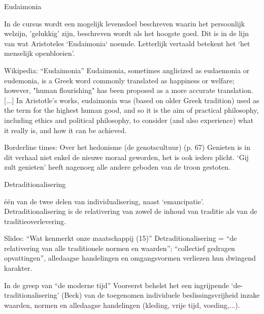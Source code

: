 \documentclass[main.tex]{subfiles}
\begin{document}
\begin{examenvraag}
    \begin{vraag}
        Eudaimonia
    \end{vraag}

    \begin{antwoord}
        In de cursus wordt een mogelijk levensdoel beschreven waarin het persoonlijk welzijn, 'gelukkig' zijn, beschreven wordt als het hoogste goed.
        Dit is in de lijn van wat Aristoteles `Eudaimonia` noemde.
        Letterlijk vertaald betekent het `het menselijk openbloeien'.
        \begin{citaat}{Wikipedia: ``Eudaimonia''}
            Eudaimonia, sometimes anglicized as eudaemonia or eudemonia, is a Greek word commonly translated as happiness or welfare; however, "human flourishing" has been proposed as a more accurate translation.
            [...]
            In Aristotle's works, eudaimonia was (based on older Greek tradition) used as the term for the highest human good, and so it is the aim of practical philosophy, including ethics and political philosophy, to consider (and also experience) what it really is, and how it can be achieved.
        \end{citaat}
        \begin{citaat}{Borderline times: Over het hedonisme (de genotscultuur) (p. 67)}
            Genieten is in dit verhaal niet enkel de nieuwe moraal geworden, het is ook ieders plicht.
            `Gij zult genieten' heeft nagenoeg alle andere geboden van de troon gestoten.
        \end{citaat}
    \end{antwoord}
\end{examenvraag}


\begin{examenvraag}
    \begin{vraag}
        Detraditionalisering
    \end{vraag}

    \begin{antwoord}
        \'e\'en van de twee delen van individualisering, naast `emancipatie'.
        Detraditionalisering is de relativering van zowel de inhoud van traditie als van de traditieoverlevering.

        \begin{citaat}{Slides: ``Wat kenmerkt onze maatschappij (15)''}
            Detraditionalisering = “de relativering van alle traditionele normen en waarden”; “collectief gedragen opvattingen”, alledaagse handelingen en omgangsvormen verliezen hun dwingend karakter.
        \end{citaat}
        \begin{citaat}{In de greep van ``de moderne tijd''}
            Vooreerst behelst het een ingrijpende `de-traditionalisering' (Beck) van de toegenomen individuele beslissingsvrijheid inzake waarden, normen en alledaagse handelingen (kleding, vrije tijd, voeding,...).
        \end{citaat}
    \end{antwoord}
\end{examenvraag}
\end{document}
